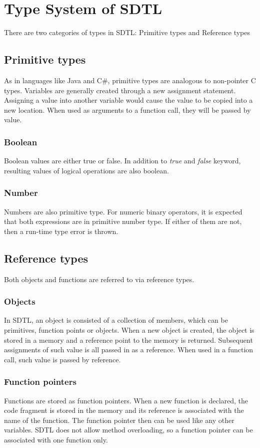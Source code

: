 \documentclass[a4paper,12pt]{article}
\begin{document}
\section{Type System of SDTL}
There are two categories of types in SDTL: Primitive types and Reference types
\subsection{Primitive types}
As in languages like Java and C\#, primitive types are analogous to non-pointer C types. Variables are generally created through a new assignment statement. Assigning a value into another variable would cause the value to be copied into a new location. When used as arguments to a function call, they will be passed by value.
\subsubsection{Boolean}
Boolean values are either true or false. In addition to \textit{true} and \textit{false} keyword, resulting values of logical operations are also boolean.
\subsubsection{Number}
Numbers are also primitive type. For numeric binary operators, it is expected that both expressions are in primitive number type. If either of them are not, then a run-time type error is thrown.
\subsection{Reference types}
Both objects and functions are referred to via reference types.
\subsubsection{Objects}
In SDTL, an object is consisted of a collection of members, which can be primitives, function points or objects. When a new object is created, the object is stored in a memory and a reference point to the memory is returned. Subsequent assignments of such value is all passed in as a reference. When used in a function call, such value is passed by reference.
\subsubsection{Function pointers}
Functions are stored as function pointers. When a new function is declared, the code fragment is stored in the memory and its reference is associated with the name of the function. The function pointer then can be used like any other variables. SDTL does not allow method overloading, so a function pointer can be associated with one function only.
\end{document}
